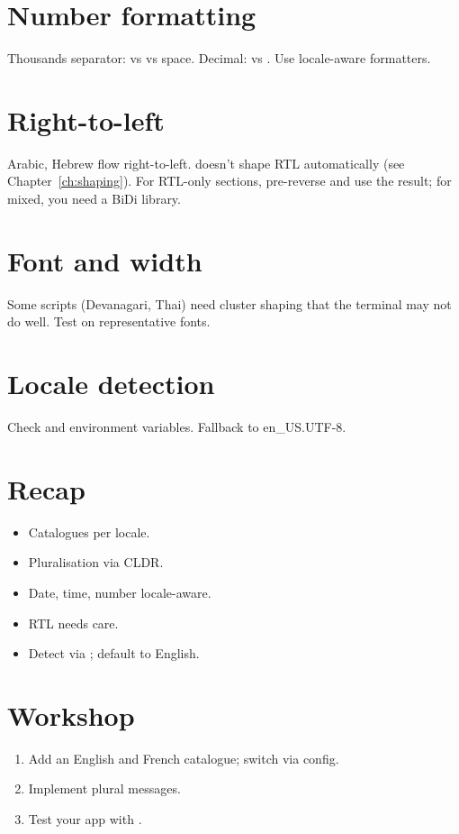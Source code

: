 \section{Number formatting}

Thousands separator: \code{,} vs  vs space.
Decimal:  vs \code{,}. Use locale-aware formatters.

\section{Right-to-left}

Arabic, Hebrew flow right-to-left. \maya{} doesn't shape
RTL automatically (see Chapter~\ref{ch:shaping}). For
RTL-only sections, pre-reverse and use the result; for
mixed, you need a BiDi library.

\section{Font and width}

Some scripts (Devanagari, Thai) need cluster shaping that
the terminal may not do well. Test on representative
fonts.

\section{Locale detection}

Check  and  environment
variables. Fallback to en\_US.UTF-8.

\section{Recap}

\begin{recap}
\begin{itemize}[leftmargin=*]
  \item Catalogues per locale.
  \item Pluralisation via CLDR.
  \item Date, time, number locale-aware.
  \item RTL needs care.
  \item Detect via ; default to English.
\end{itemize}
\end{recap}

\section*{Workshop}

\begin{enumerate}[leftmargin=*]
  \item Add an English and French catalogue; switch via
    config.
  \item Implement plural messages.
  \item Test your app with .
\end{enumerate}
